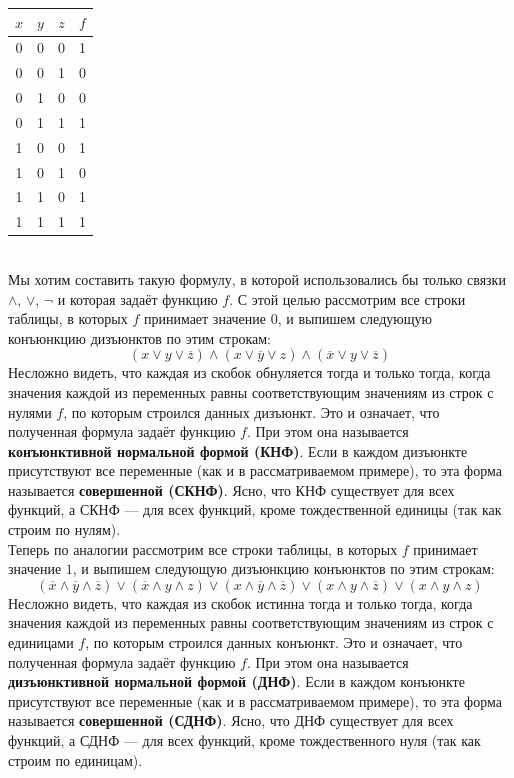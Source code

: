 \documentclass[11pt]{article}
\begin{document}
\begin{center}
    \begin{tabular}{|c|c|c|c|}
    \hline
    $x$ & $y$ & $z$ & $f$ \\
    \hline
    0 & 0 & 0 & 1 \\
    \hline
    0 & 0 & 1 & 0 \\
    \hline
    0 & 1 & 0 & 0 \\
    \hline
    0 & 1 & 1 & 1 \\
    \hline
    1 & 0 & 0 & 1 \\
    \hline
    1 & 0 & 1 & 0 \\
    \hline
    1 & 1 & 0 & 1 \\
    \hline
    1 & 1 & 1 & 1 \\
    \hline
\end{tabular}
\end{center} \leavevmode
\\
Мы хотим составить такую формулу, в которой использовались бы только связки $\land$, $\lor$, $\lnot$ и которая
задаёт функцию $f$. С этой целью рассмотрим все строки таблицы, в которых $f$ принимает значение $0$, и выпишем 
следующую конъюнкцию дизъюнктов по этим строкам:
\[(x \lor y \lor \overline{z}) \land (x \lor \overline{y} \lor z) \land (\overline{x} \lor y \lor \overline{z})\]
Несложно видеть, что каждая из скобок обнуляется тогда и только тогда, когда значения каждой из переменных
равны соответствующим значениям из строк с нулями $f$, по которым строился данных дизъюнкт. Это и означает, что 
полученная формула задаёт функцию $f$. При этом она называется \textbf{конъюнктивной нормальной формой (КНФ)}. Если 
в каждом дизъюнкте присутствуют все переменные (как и в рассматриваемом примере), то эта форма называется 
\textbf{совершенной (СКНФ)}. Ясно, что КНФ существует для всех функций, а СКНФ --- для всех функций, кроме тождественной единицы (так как строим по нулям).
\\
Теперь по аналогии рассмотрим все строки таблицы, в которых $f$ принимает значение $1$, и выпишем следующую 
дизъюнкцию конъюнктов по этим строкам:
\[(\overline{x} \land \overline{y} \land \overline{z}) \lor (\overline{x} \land y \land z) \lor (x \land \overline{y} \land \overline{z}) \lor (x \land y \land \overline{z}) \lor (x \land y \land z)\]
Несложно видеть, что каждая из скобок истинна тогда и только тогда, когда значения каждой из переменных
равны соответствующим значениям из строк с единицами $f$, по которым строился данных конъюнкт. Это и означает, что 
полученная формула задаёт функцию $f$. При этом она называется \textbf{дизъюнктивной нормальной формой (ДНФ)}. Если 
в каждом конъюнкте присутствуют все переменные (как и в рассматриваемом примере), то эта форма называется 
\textbf{совершенной (СДНФ)}. Ясно, что ДНФ существует для всех функций, а СДНФ --- для всех функций, кроме тождественного нуля (так как строим по единицам).
\end{document}
